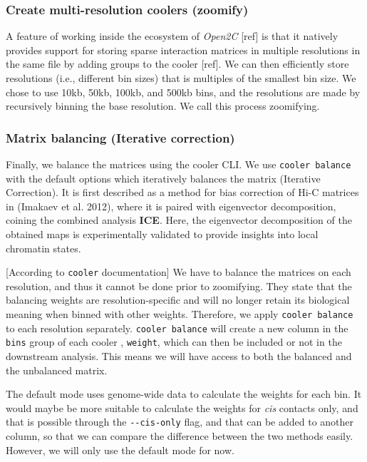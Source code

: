 \documentclass[
  11pt,
  a4paper,
]{scrbook}
\let\oldemph\emph
\renewcommand\emph[1]{\oldemph{\color{gray}#1}}
\begin{document}
\subsubsection{Create multi-resolution coolers
(zoomify)}\label{create-multi-resolution-coolers-zoomify}

A feature of working inside the ecosystem of \emph{Open2C} {[}ref{]} is
that it natively provides support for storing sparse interaction
matrices in multiple resolutions in the same file by adding groups to
the cooler {[}ref{]}. We can then efficiently store resolutions (i.e.,
different bin sizes) that is multiples of the smallest bin size. We
chose to use 10kb, 50kb, 100kb, and 500kb bins, and the resolutions are
made by recursively binning the base resolution. We call this process
zoomifying.

\subsubsection{Matrix balancing (Iterative
correction)}\label{matrix-balancing-iterative-correction}

Finally, we balance the matrices using the cooler CLI. We use
\texttt{cooler\ balance} with the default options which iteratively
balances the matrix (Iterative Correction). It is first described as a
method for bias correction of Hi-C matrices in (Imakaev et al. 2012),
where it is paired with eigenvector decomposition, coining the combined
analysis \textbf{ICE}. Here, the eigenvector decomposition of the
obtained maps is experimentally validated to provide insights into local
chromatin states.

{[}According to \texttt{cooler} documentation{]} We have to balance the
matrices on each resolution, and thus it cannot be done prior to
zoomifying. They state that the balancing weights are
resolution-specific and will no longer retain its biological meaning
when binned with other weights. Therefore, we apply
\texttt{cooler\ balance} to each resolution separately.
\texttt{cooler\ balance} will create a new column in the \texttt{bins}
group of each cooler , \texttt{weight}, which can then be included or
not in the downstream analysis. This means we will have access to both
the balanced and the unbalanced matrix.

The default mode uses genome-wide data to calculate the weights for each
bin. It would maybe be more suitable to calculate the weights for
\emph{cis} contacts only, and that is possible through the
\texttt{-\/-cis-only} flag, and that can be added to another column, so
that we can compare the difference between the two methods easily.
However, we will only use the default mode for now.
\end{document}

